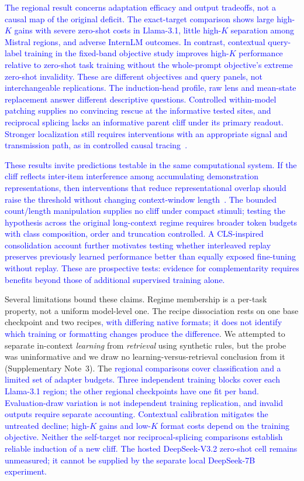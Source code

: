 \documentclass[pdflatex, sn-nature]{sn-jnl}%
\theoremstyle{thmstyleone}%
\theoremstyle{thmstyletwo}%
\theoremstyle{thmstylethree}%
\begin{document}
\textcolor{blue}{The regional result concerns adaptation efficacy and output tradeoffs, not a causal map of the original deficit. The exact-target comparison shows large high-$K$ gains with severe zero-shot costs in Llama-3.1, little high-$K$ separation among Mistral regions, and adverse InternLM outcomes. In contrast, contextual query-label training in the fixed-band objective study improves high-$K$ performance relative to zero-shot task training without the whole-prompt objective's extreme zero-shot invalidity. These are different objectives and query panels, not interchangeable replications. The induction-head profile, raw lens and mean-state replacement answer different descriptive questions. Controlled within-model patching supplies no convincing rescue at the informative tested sites, and reciprocal splicing lacks an informative parent cliff under its primary readout. Stronger localization still requires interventions with an appropriate signal and transmission path, as in controlled causal tracing~\cite{meng2022causaltracing}.}


\textcolor{blue}{These results invite predictions testable in the same computational system. If the
cliff reflects inter-item interference among accumulating demonstration representations,
then interventions that reduce representational overlap should raise the threshold
without changing context-window length}~\textcolor{blue}{\cite{bertsch2025longicl,zou2025manyiclbench}}\textcolor{blue}{.
The bounded count/length manipulation supplies no cliff under compact stimuli; testing the hypothesis across the original long-context regime requires broader token budgets with class composition, order and truncation controlled. A CLS-inspired consolidation account
further motivates testing whether interleaved replay preserves previously learned
performance better than equally exposed fine-tuning without replay. These are
prospective tests: evidence for complementarity requires benefits beyond those of
additional supervised training alone.}

Several limitations bound these claims. Regime membership is a per-task property, not
a uniform model-level one. The recipe dissociation rests on one base checkpoint and
two recipes\textcolor{blue}{, with differing native formats; it does not identify which training or
formatting changes produce the difference}. We attempted to separate in-context
\emph{learning} from \emph{retrieval} using synthetic rules, but
the probe was uninformative and we draw no learning-versus-retrieval conclusion from
it (Supplementary Note~3). The \textcolor{blue}{regional comparisons cover classification and a limited
set of adapter budgets. Three independent training blocks cover each Llama-3.1 region; the other regional checkpoints have one fit per band. Evaluation-draw variation is not independent training
replication, and invalid outputs require separate accounting. Contextual calibration
mitigates the untreated decline; high-$K$ gains and low-$K$ format costs depend on
the training objective. Neither the self-target nor reciprocal-splicing comparisons establish reliable induction of a new cliff. The hosted DeepSeek-V3.2 zero-shot cell remains unmeasured; it cannot be supplied by the separate local DeepSeek-7B experiment.}
\end{document}

